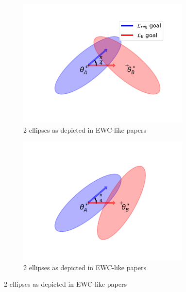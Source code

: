 \documentclass[twocolumn]{article}
\begin{document}
\begin{figure}
    \centering
    \begin{subfigure}[b]{0.25\textwidth}
        \centering
        \includegraphics[width=0.95\textwidth]{images/ellipse_overlap_45.png}
        \caption{2 ellipses as depicted in EWC-like papers}
        \label{fig:two_ellipses_45_hard}
    \end{subfigure}
    \hspace{-8mm}
    \begin{subfigure}[b]{0.25\textwidth}
        \centering
        \includegraphics[width=0.95\textwidth]{images/ellipse_overlap_45_hard.png}
        \caption{2 ellipses as depicted in EWC-like papers}
        \label{fig:two_ellipses_45}
    \end{subfigure}
    \hspace{-8mm}

\end{figure}
\end{document}
